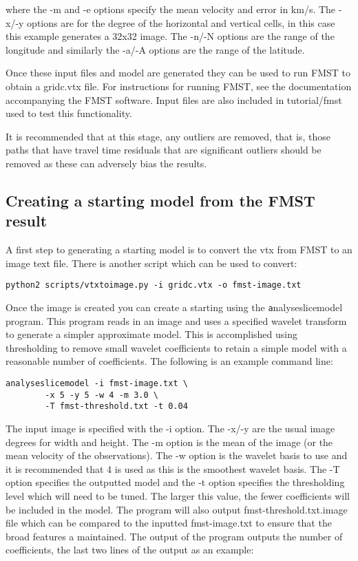\documentclass[a4paper,12pt]{article}
\begin{document}
where the -m and -e options specify the mean velocity and
error in km/s. The -x/-y options are for the degree of the horizontal
and vertical cells, in this case this example generates a 32x32 image.
The -n/-N options are the range of the longitude
and similarly the -a/-A options are the range of the latitude.

Once these input files and model are generated they can be used
to run FMST to obtain a gridc.vtx file. For instructions for running
FMST, see the documentation accompanying the FMST software.
Input files are also included in tutorial/fmst used to
test this functionality.

It is recommended that at this stage, any outliers are removed, that is,
those paths that have travel time residuals that are significant outliers
should be removed as these can adversely bias the results.

\subsection{Creating a starting model from the FMST result}

A first step to generating a starting model is to convert the vtx
from FMST to an image text file. There is another script
which can be used to convert:

\begin{verbatim}
python2 scripts/vtxtoimage.py -i gridc.vtx -o fmst-image.txt
\end{verbatim}

Once the image is created you can create a starting using the
{\texttt analyseslicemodel} program. This program reads in an
image and uses a specified wavelet transform to generate a simpler
approximate model. This is accomplished using 
thresholding to remove small wavelet coefficients to retain a simple model
with a reasonable number of coefficients.
The following is an example command line:

\begin{verbatim}
analyseslicemodel -i fmst-image.txt \
        -x 5 -y 5 -w 4 -m 3.0 \
        -T fmst-threshold.txt -t 0.04
\end{verbatim}

The input image is specified with the -i option. The -x/-y are the
usual image degrees for width and height. The -m option is the mean of
the image (or the mean velocity of the observations). The -w option is
the wavelet basis to use and it is recommended that 4 is used as this
is the smoothest wavelet basis. The -T option specifies the outputted
model and the -t option specifies the thresholding level which will
need to be tuned.  The larger this value, the fewer coefficients will
be included in the model. The program will also output
fmst-threshold.txt.image file which can be compared to the inputted
fmst-image.txt to ensure that the broad features a maintained. The
output of the program outputs the number of coefficients, the last two
lines of the output as an example:
\end{document}

